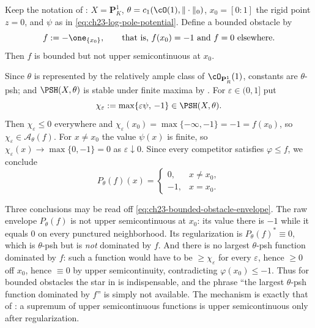 \begin{example}
\label{ex:ch23-bounded-obstacle-failure}
Keep the notation of : \(X=\mathbf P^1_K\),
\(\theta=c_1(\cO(1),\|\cdot\|_0)\), \(x_0=[0:1]\) the rigid point \(z=0\),
and \(\psi\) as in \eqref{eq:ch23-log-pole-potential}.  Define a bounded
obstacle by
\[
 f:=-\one_{\{x_0\}},
 \qquad\text{that is, } f(x_0)=-1 \text{ and } f=0 \text{ elsewhere}.
\]
Then \(f\) is bounded but not upper semicontinuous at \(x_0\).

Since \(\theta\) is represented by the relatively ample class of
\(\cO_{\mathbf P^1_R}(1)\), constants are \(\theta\)-psh; and
\(\PSH(X,\theta)\) is stable under finite maxima by
.  For \(\varepsilon\in(0,1]\) put
\[
 \chi_\varepsilon:=\max\{\varepsilon\psi,\,-1\}\in\PSH(X,\theta).
\]
Then \(\chi_\varepsilon\leq0\) everywhere and
\(\chi_\varepsilon(x_0)=\max\{-\infty,-1\}=-1=f(x_0)\), so
\(\chi_\varepsilon\in\mathcal A_\theta(f)\).  For \(x\ne x_0\) the value
\(\psi(x)\) is finite, so
\(\chi_\varepsilon(x)\to\max\{0,-1\}=0\) as \(\varepsilon\downarrow0\).
Since every competitor satisfies \(\varphi\leq f\), we conclude
\begin{equation}\label{eq:ch23-bounded-obstacle-envelope}
 P_\theta(f)(x)=
 \begin{cases}
  0,& x\ne x_0,\\
  -1,& x=x_0 .
 \end{cases}
\end{equation}

Three conclusions may be read off \eqref{eq:ch23-bounded-obstacle-envelope}.
The raw envelope \(P_\theta(f)\) is not upper semicontinuous at \(x_0\): its
value there is \(-1\) while it equals \(0\) on every punctured neighborhood.
Its regularization is \(P_\theta(f)^*\equiv0\), which is \(\theta\)-psh but
is \emph{not} dominated by \(f\).  And there is no largest \(\theta\)-psh
function dominated by \(f\): such a function would have to be \(\geq
\chi_\varepsilon\) for every \(\varepsilon\), hence \(\geq0\) off \(x_0\),
hence \(\equiv 0\) by upper semicontinuity, contradicting
\(\varphi(x_0)\leq-1\).  Thus for bounded obstacles the star in
 is indispensable, and the phrase ``the largest
\(\theta\)-psh function dominated by \(f\)'' is simply not available.  The
mechanism is exactly that of : a supremum of upper
semicontinuous functions is upper semicontinuous only after regularization.
\end{example}

